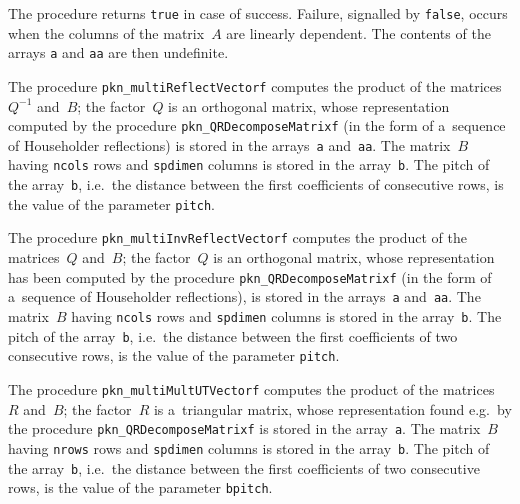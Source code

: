 The procedure returns \texttt{true} in case of success. Failure, signalled
by \texttt{false}, occurs when the columns of the matrix~$A$ are linearly
dependent. The contents of the arrays \texttt{a} and \texttt{aa} are then
undefinite.

\newpage
The procedure \texttt{pkn\_multiReflectVectorf} computes the product
of the matrices~$Q^{-1}$ and~$B$; the factor~$Q$ is an orthogonal matrix,
whose representation computed by the procedure \texttt{pkn\_QRDecomposeMatrixf}
(in the form of a~sequence of Householder reflections) is stored
in the arrays~\texttt{a} and~\texttt{aa}. The matrix~$B$ having
\texttt{ncols} rows and \texttt{spdimen} columns is stored in the
array~\texttt{b}.
The pitch of the array~\texttt{b}, i.e.\ the distance between the first
coefficients of consecutive rows, is the value of the parameter
\texttt{pitch}.

\vspace{\bigskipamount}
The procedure \texttt{pkn\_multiInvReflectVectorf} computes the product
of the matrices~$Q$ and~$B$; the factor~$Q$ is an orthogonal matrix,
whose representation has been computed by the procedure
\texttt{pkn\_QRDecomposeMatrixf} (in the form of a~sequence of Householder
reflections), is stored in the arrays~\texttt{a} and~\texttt{aa}.
The matrix~$B$ having \texttt{ncols} rows and \texttt{spdimen} columns
is stored in the array~\texttt{b}.
The pitch of the array~\texttt{b}, i.e.\ the distance between the first
coefficients of two consecutive rows, is the value of the parameter
\texttt{pitch}.

\vspace{\bigskipamount}
{}
The procedure \texttt{pkn\_multiMultUTVectorf} computes the product
of the matrices~$R$ and~$B$; the factor~$R$ is a~triangular matrix,
whose representation found e.g.\ by the procedure
\texttt{pkn\_QRDecomposeMatrixf} is stored in the array~\texttt{a}.
The matrix~$B$ having \texttt{nrows} rows and 
\texttt{spdimen} columns is stored in the array~\texttt{b}.
The pitch of the array~\texttt{b}, i.e.\ the distance between the first
coefficients of two consecutive rows, is the value of the parameter
\texttt{bpitch}.

